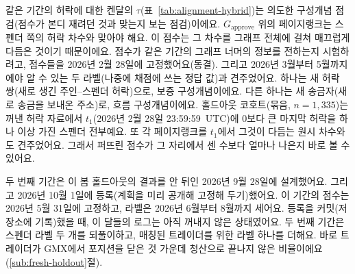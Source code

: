 
같은 기간의 허락에 대한 켄달의 $\tau$(표~\ref{tab:alignment-hybrid})는 의도한 구성개념 점검(점수가 본디 재려던 것과 맞는지 보는 점검)이에요. $G_{\text{approve}}$ 위의 페이지랭크는 스펜더 쪽의 허락 차수와 맞아야 해요. 이 점수는 그 차수를 그래프 전체에 걸쳐 매끄럽게 다듬은 것이기 때문이에요. 점수가 같은 기간의 그래프 너머의 정보를 전하는지 시험하려고, 점수들을 2026년 2월 28일에 고정했어요(동결). 그리고 2026년 3월부터 5월까지에야 알 수 있는 두 라벨(나중에 채점에 쓰는 정답 값)과 견주었어요. 하나는 새 허락 쌍(새로 생긴 주인--스펜더 허락)으로, 보증 구성개념이에요. 다른 하나는 새 송금자(새로 송금을 보내온 주소)로, 흐름 구성개념이에요. 홀드아웃 코호트(묶음, $n=1{,}335$)는 꺼낸 허락 자료에서 $t_1$(2026년 2월 28일 23:59:59~UTC)에 0보다 큰 마지막 허락을 하나 이상 가진 스펜더 전부예요. 또 각 페이지랭크를 $t_1$에서 그것이 다듬는 원시 차수와도 견주었어요. 그래서 퍼뜨린 점수가 그 자리에서 센 수보다 얼마나 나은지 바로 볼 수 있어요.

두 번째 기간은 이 봄 홀드아웃의 결과를 안 뒤인 2026년 9월 28일에 설계했어요. 그리고 2026년 10월 1일에 등록(계획을 미리 공개해 고정해 두기)했어요. 이 기간의 점수는 2026년 5월 31일에 고정하고, 라벨은 2026년 6월부터 8월까지 세어요. 등록을 커밋(저장소에 기록)했을 때, 이 달들의 로그는 아직 꺼내지 않은 상태였어요. 두 번째 기간은 스펜더 라벨 두 개를 되풀이하고, 매칭된 트레이더를 위한 라벨 하나를 더해요. 바로 트레이더가 GMX에서 포지션을 닫은 것 가운데 청산으로 끝나지 않은 비율이에요(\ref{sub:fresh-holdout}절).

